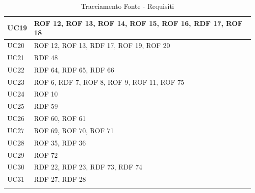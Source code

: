 \documentclass[12pt, oneside]{article}
\begin{document}
\begin{longtable}{|p{4cm}|p{12cm}|}
    \hline
    UC19 & ROF 12, ROF 13, ROF 14, ROF 15, ROF 16, RDF 17, ROF 18 \\
    \hline
    UC20 & ROF 12, ROF 13, RDF 17, ROF 19, ROF 20\\
    \hline
    UC21 & RDF 48 \\
    \hline
    UC22 & RDF 64, RDF 65, RDF 66 \\
    \hline
    UC23 & ROF 6, RDF 7, ROF 8, ROF 9, ROF 11, ROF 75\\
    \hline
    UC24 & ROF 10\\
    \hline
    UC25 & RDF 59 \\
    \hline
    UC26 & ROF 60, ROF 61 \\
    \hline
    UC27 & ROF 69, ROF 70, ROF 71 \\
    \hline
    UC28 & ROF 35, RDF 36 \\
    \hline
    UC29 & ROF 72 \\
    \hline
    UC30 & RDF 22, RDF 23, RDF 73, RDF 74 \\
    \hline
    UC31 & RDF 27, RDF 28 \\
    \hline

\caption{Tracciamento Fonte - Requisiti}
    
\end{longtable}
\end{document}
